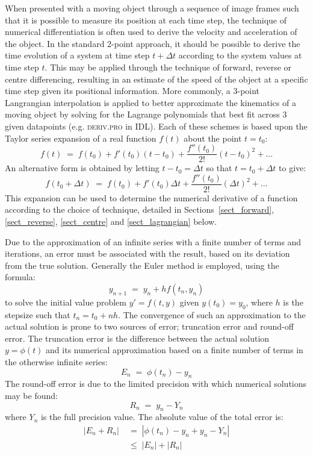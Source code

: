 \documentclass[namedreferences]{SolarPhysics}
\begin{document}
\begin{article}
When presented with a moving object through a sequence of image frames such that it is possible to measure its position at each time step, the technique of numerical differentiation is often used to derive the velocity and acceleration of the object. In the standard 2-point approach, it should be possible to derive the time evolution of a system at time step $t+\Delta t$ according to the system values at time step $t$. This may be applied through the technique of forward, reverse or centre differencing, resulting in an estimate of the speed of the object at a specific time step given its positional information. More commonly, a 3-point Langrangian interpolation is applied to better approximate the kinematics of a moving object by solving for the Lagrange polynomials that best fit across 3 given datapoints (e.g. \textsc{deriv.pro} in IDL). Each of these schemes is based upon the Taylor series expansion of a real function $f(t)$ about the point $t=t_0$:
\begin{equation}
\label{taylor1}
f(t) \; = \; f(t_0) + f'(t_0)(t-t_0) +  \frac{f''(t_0)}{2!}(t-t_0)^{2}   + ...
\end{equation}
An alternative form is obtained by letting $t-t_0=\Delta t$ so that $t=t_0+\Delta t$ to give:
\begin{equation}
\label{taylor2}
f(t_0+\Delta t) \; = \; f(t_0)+f'(t_0)\Delta t +  \frac{f''(t_0)}{2!}(\Delta t)^{2}  + ...
\end{equation}
This expansion can be used to determine the numerical derivative of a function according to the choice of technique, detailed in Sections~\ref{sect_forward}, \ref{sect_reverse}, \ref{sect_centre} and \ref{sect_lagrangian} below.

Due to the approximation of an infinite series with a finite number of terms and iterations, an error must be associated with the result, based on its deviation from the true solution. Generally the Euler method is employed, using the formula:
\begin{equation}
y_{n+1} \; = \; y_n + h f(t_n, y_n)
\end{equation}
to solve the initial value problem $y'=f(t,y)$ given $y(t_0)=y_0$, where $h$ is the stepsize such that $t_n=t_0+nh$. The convergence of such an approximation to the actual solution is prone to two sources of error; truncation error and round-off error. The truncation error is the difference between the actual solution $y=\phi(t)$ and its numerical approximation based on a finite number of terms in the otherwise infinite series:
\begin{equation}
E_n \; = \; \phi(t_n) - y_n
\end{equation}
The round-off error is due to the limited precision with which numerical solutions may be found:
\begin{equation}
R_n \; = \; y_n-Y_n
\end{equation}
where $Y_n$ is the full precision value. The absolute value of the total error is:
\begin{eqnarray}
|E_n+R_n| \; &= \; |\phi(t_n)-y_n+y_n-Y_n| \\
& \le \; |E_n| + |R_n|
\end{eqnarray}


\end{article}
\end{document}
